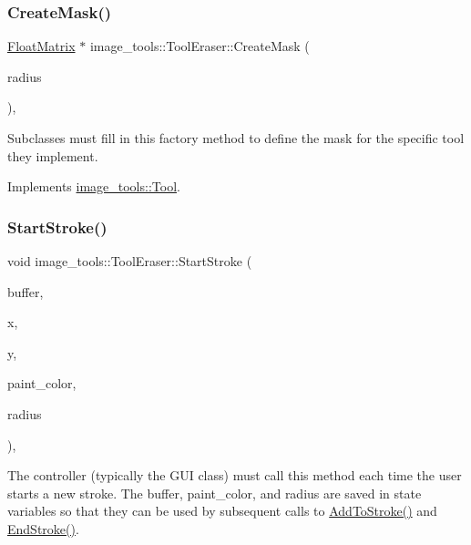 \subsubsection{\texorpdfstring{Create\+Mask()}{CreateMask()}}
{\footnotesize\ttfamily \hyperlink{classimage__tools_1_1FloatMatrix}{Float\+Matrix} $\ast$ image\+\_\+tools\+::\+Tool\+Eraser\+::\+Create\+Mask (\begin{DoxyParamCaption}\item[{float}]{radius }\end{DoxyParamCaption})\hspace{0.3cm}{\ttfamily [override]}, {\ttfamily [virtual]}}

Subclasses must fill in this factory method to define the mask for the specific tool they implement. 

Implements \hyperlink{classimage__tools_1_1Tool_a7d58325846dbc0467e52221daa1310a7}{image\+\_\+tools\+::\+Tool}.

\mbox{\label{classimage__tools_1_1ToolEraser_a5b00cd104c6fb0b34fa3f1f5165ab189}} 
\subsubsection{\texorpdfstring{Start\+Stroke()}{StartStroke()}}
{\footnotesize\ttfamily void image\+\_\+tools\+::\+Tool\+Eraser\+::\+Start\+Stroke (\begin{DoxyParamCaption}\item[{\hyperlink{classimage__tools_1_1PixelBuffer}{Pixel\+Buffer} $\ast$}]{buffer,  }\item[{int}]{x,  }\item[{int}]{y,  }\item[{const \hyperlink{classimage__tools_1_1ColorData}{Color\+Data} \&}]{paint\+\_\+color,  }\item[{float}]{radius }\end{DoxyParamCaption})\hspace{0.3cm}{\ttfamily [override]}, {\ttfamily [virtual]}}

The controller (typically the G\+UI class) must call this method each time the user starts a new stroke. The buffer, paint\+\_\+color, and radius are saved in state variables so that they can be used by subsequent calls to \hyperlink{classimage__tools_1_1Tool_a84d87d7baec8a961be236d4b30636fc0}{Add\+To\+Stroke()} and \hyperlink{classimage__tools_1_1Tool_aa76f5cae95ea7cdc30b067b84857a0f5}{End\+Stroke()}. 

